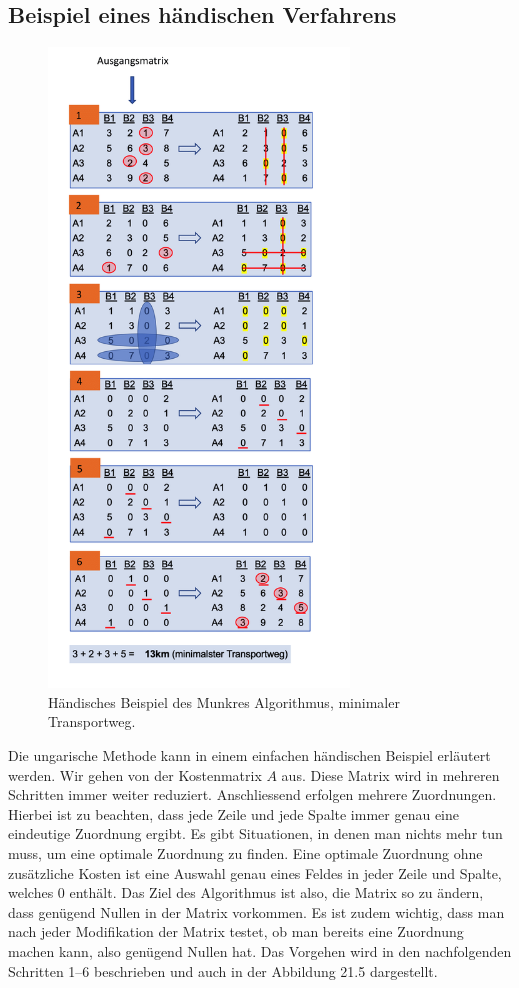 \subsection{Beispiel eines händischen Verfahrens
\label{munkres:subsection:malorum}}
\begin{figure}
\centering
\includegraphics[width=8cm]{papers/munkres/figures/Ungarische_Methode_Beispiel.png}
\caption{Händisches Beispiel des Munkres Algorithmus, minimaler Transportweg.}
\label{munkres:Vr2}
\end{figure}

Die ungarische Methode kann in einem einfachen händischen Beispiel erläutert werden. Wir gehen von der Kostenmatrix $A$ aus. Diese Matrix wird in mehreren Schritten immer weiter reduziert. Anschliessend erfolgen mehrere Zuordnungen. Hierbei ist zu beachten, dass jede Zeile und jede Spalte immer genau eine eindeutige Zuordnung ergibt. Es gibt Situationen, in denen man nichts mehr tun muss, um eine optimale Zuordnung zu finden. Eine optimale Zuordnung ohne zusätzliche Kosten ist eine Auswahl genau eines Feldes in jeder Zeile und Spalte, welches 0 enthält. Das Ziel des Algorithmus ist also, die Matrix so zu ändern, dass genügend Nullen in der Matrix vorkommen. Es ist zudem wichtig, dass man nach jeder Modifikation der Matrix testet, ob man bereits eine Zuordnung machen kann, also genügend Nullen hat.
Das Vorgehen wird in den nachfolgenden Schritten 1--6 beschrieben und auch in der Abbildung 21.5 dargestellt.


